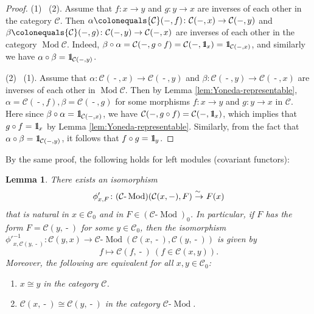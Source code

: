 \documentclass{surv-l}
\numberwithin{equation}{chapter}
\numberwithin{figure}{chapter}
\theoremstyle{plain}
\newtheorem{lem}[thm]{Lemma}
\theoremstyle{definition}
\theoremstyle{remark}
\newcommand{\id}{1\kern-.25em{\text{{\rm l}}}}
\newcommand{\isoto}{\
  \raise.8ex\hbox{$^{\sim}$}\kern-.7em\hbox{$\to$}\ }
\DeclareMathOperator{\Mod}{Mod}
\DeclareMathOperator{\blank}{-}
\begin{document}
\begin{proof}
(1) \text{$\Rightarrow$}\  (2).
Assume that $f \colon x \to y$ and $g \colon y \to x$
are inverses of each other in the category ${\mathcal{C}}$.
Then
$\alpha\colonequals {\mathcal{C}}(\blank, f) \colon {\mathcal{C}}(\blank, x) \to {\mathcal{C}}(\blank, y)$ and
$\beta\colonequals  {\mathcal{C}}(\blank, g) \colon {\mathcal{C}}(\blank, y) \to {\mathcal{C}}(\blank, x)$ are
inverses of each other in the category $\Mod {\mathcal{C}}$.
Indeed, $\beta \circ \alpha = {\mathcal{C}}(\blank, g \circ f) = {\mathcal{C}}(\blank, \id_x) = \id_{{\mathcal{C}}(\blank, x)}$, and similarly we have
$\alpha \circ \beta = \id_{{\mathcal{C}}(\blank, y)}$.

(2) \text{$\Rightarrow$}\  (1).
Assume that $\alpha\colon {\mathcal{C}}(\blank, x) \to {\mathcal{C}}(\blank, y)$ and
$\beta \colon {\mathcal{C}}(\blank, y) \to {\mathcal{C}}(\blank, x)$ are inverses of each other
in $\Mod {\mathcal{C}}$.
Then by Lemma \ref{lem:Yoneda-representable},
$\alpha ={\mathcal{C}}(\blank, f), \beta = {\mathcal{C}}(\blank, g)$ for some morphisms
$f \colon x \to y$ and $g \colon y \to x$ in ${\mathcal{C}}$.
Here since $\beta \circ \alpha = \id_{{\mathcal{C}}(\blank, x)}$, we have
${\mathcal{C}}(\blank, g \circ f) = {\mathcal{C}}(\blank, \id_x)$, which implies that
$g \circ f = \id_x$
by Lemma \ref{lem:Yoneda-representable}.
Similarly, from the fact that $\alpha \circ \beta = \id_{{\mathcal{C}}(\blank, y)}$, it follows that
$f \circ g = \id_y$.
\end{proof}

By the same proof, the following holds for left modules (covariant functors):

\begin{lem}\label{lem:Yoneda-left}
There exists an isomorphism
\[
\phi'_{x,F}\colon ({\mathcal{C}}\text{-}\Mod)({\mathcal{C}}(x, \blank), F) \isoto F(x)
\]
that is natural in $x \in {\mathcal{C}}_0$ and in $F \in ({\mathcal{C}}\text{-}\Mod)_0$.
In particular, if
$F$ has the form $F = {\mathcal{C}}(y, \blank)$ for some $y \in {\mathcal{C}}_0$,
then the isomorphism
${\phi'}^{-1}_{x, {\mathcal{C}}(y, \blank)} \colon {\mathcal{C}}(y, x) \to {\mathcal{C}}\text{-}\Mod({\mathcal{C}}(x,\blank), {\mathcal{C}}(y, \blank))$
is given by
\[
f \mapsto {\mathcal{C}}(f, \blank)\ (f \in {\mathcal{C}}(x,y)).
\]
Moreover, the following are equivalent for all $x, y \in {\mathcal{C}}_0$:
\begin{enumerate}
\item
$x \cong y$ in the category ${\mathcal{C}}$.
\item
${\mathcal{C}}(x, \blank) \cong {\mathcal{C}}(y, \blank)$ in the category ${\mathcal{C}}\!\text{-}\!\Mod$.
\end{enumerate}
\end{lem}
\end{document}
